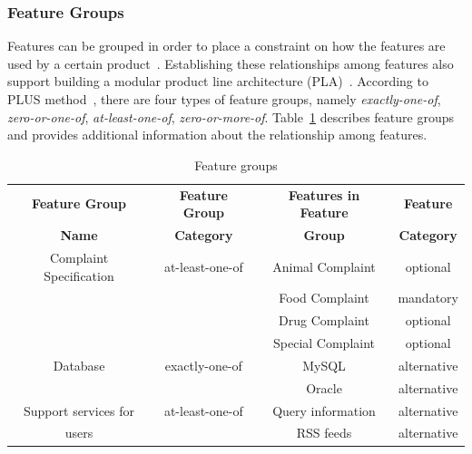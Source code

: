 \documentclass[11pt,twoside]{article}
\begin{document}
 



\subsubsection{Feature Groups}
\label{sec:featGroups}
Features can be grouped in order to place a constraint on how the features are used by a certain product~\cite{Gomaa:2004:DSP}. Establishing
these relationships among features also support building a modular product line architecture (PLA)~\cite{Lee:2004:FDA}. According to PLUS
method~\cite[Chapter 5.5]{Gomaa:2004:DSP}, there are four types of feature groups, namely \textit{exactly-one-of}, \textit{zero-or-one-of},
\textit{at-least-one-of}, \textit{zero-or-more-of}.  Table~\ref{tab:featureGroup} describes feature groups and provides additional
information about the relationship among features. 
\begin{table}
\begin{center}
\begin{footnotesize}
\begin{tabular}{c|c|c|c} \hline
 \textbf{Feature Group} & \textbf{Feature Group} & \textbf{Features in Feature} & \textbf{Feature} \\
  \textbf{Name} 	       & \textbf{Category}      & \textbf{Group}               & \textbf{Category} \\ \hline
Complaint Specification & at-least-one-of & Animal Complaint & optional \\ 
		        &              & Food Complaint & mandatory \\
			&              & Drug Complaint & optional \\
			&              & Special Complaint & optional \\  \hline
Database                & exactly-one-of  & MySQL & alternative \\
		        &                 & Oracle & alternative \\ \hline
Support services for    & at-least-one-of & Query information & alternative \\
users		        &                 & RSS feeds & alternative \\  \hline		        
\end{tabular}
\end{footnotesize}
\end{center}
\caption{Feature groups} 
\label{tab:featureGroup}
\end{table}
\end{document}
